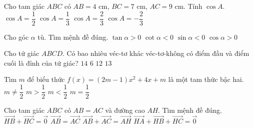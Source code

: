 \begin{ex}%
	Cho tam giác $ABC$ có $AB=4$ cm, $BC=7$ cm, $AC=9$ cm. Tính $\cos A$.
	\choice
	{$\cos A=\dfrac{1}{2}$}
	{$\cos A=\dfrac{1}{3}$}
	{\True $\cos A=\dfrac{2}{3}$}
	{$\cos A=-\dfrac{2}{3}$}
\end{ex}
\begin{ex}%
	Cho góc $\alpha$ tù. Tìm mệnh đề đúng.
	\choice
	{$\tan\alpha >0$}
	{\True $\cot\alpha <0$}
	{$\sin\alpha <0$}
	{$\cos\alpha >0$}
\end{ex}
\begin{ex}%
	Cho tứ giác $ABCD$. Có bao nhiêu véc-tơ khác véc-tơ-không có điểm đầu và điểm cuối là đỉnh của tứ giác? 
	\choice
	{$14$}
	{$6$}
	{\True $12$}
	{$13$}
\end{ex}
\begin{ex}%
	Tìm $m$ để biểu thức $f(x)=(2m-1)x^2+4x+m$ là một tam thức bậc hai.
	\choice
	{\True $m\neq \dfrac{1}{2}$}
	{$m>\dfrac{1}{2}$}
	{$m<\dfrac{1}{2}$}
	{$m=\dfrac{1}{2}$}
\end{ex}
\begin{ex}%
	Cho tam giác $ABC$ có $AB=AC$ và đường cao $AH$. Tìm mệnh đề đúng.
	\choice
	{\True $\overrightarrow{HB}+\overrightarrow{HC}=\overrightarrow{0}$}
	{$\overrightarrow{AB}=\overrightarrow{AC}$}
	{$\overrightarrow{AB}+\overrightarrow{AC}=\overrightarrow{AH}$}
	{$\overrightarrow{HA}+\overrightarrow{HB}+\overrightarrow{HC}=\overrightarrow{0}$}
\end{ex}
